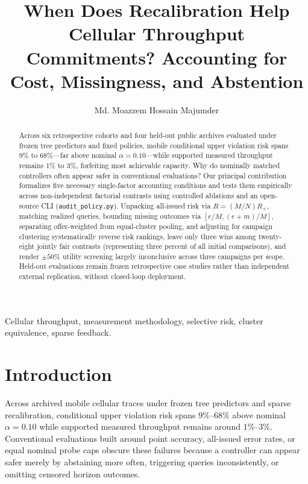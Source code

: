 \documentclass[journal,10pt]{IEEEtran}
\begin{document}
\title{When Does Recalibration Help Cellular Throughput Commitments? Accounting for Cost, Missingness, and Abstention}
\author{Md. Moazzem Hossain Majumder}
\maketitle
\begin{abstract}
Across six retrospective cohorts and four held-out public archives evaluated under frozen tree predictors and fixed policies, mobile conditional upper violation risk spans 9\% to 68\%---far above nominal $\alpha=0.10$---while supported measured throughput remains 1\% to 3\%, forfeiting most achievable capacity. Why do nominally matched controllers often appear safer in conventional evaluations? Our principal contribution formalizes five necessary single-factor accounting conditions and tests them empirically across non-independent factorial contrasts using controlled ablations and an open-source CLI (\texttt{audit\_policy.py}). Unpacking all-issued risk via $R=(M/N)R_+$, matching realized queries, bounding missing outcomes via $[e/M,(e+m)/M]$, separating offer-weighted from equal-cluster pooling, and adjusting for campaign clustering systematically reverse risk rankings, leave only three wins among twenty-eight jointly fair contrasts (representing three percent of all initial comparisons), and render $\pm 50\%$ utility screening largely inconclusive across three campaigns per scope. Held-out evaluations remain frozen retrospective case studies rather than independent external replication, without closed-loop deployment.
\end{abstract}
\begin{IEEEkeywords}Cellular throughput, measurement methodology, selective risk, cluster equivalence, sparse feedback.\end{IEEEkeywords}

\section{Introduction}
\label{sec:intro}
Across archived mobile cellular traces under frozen tree predictors and sparse recalibration, conditional upper violation risk spans $9\%$--$68\%$ above nominal $\alpha=0.10$ while supported measured throughput remains around $1\%$--$3\%$. Conventional evaluations built around point accuracy, all-issued error rates, or equal nominal probe caps obscure these failures because a controller can appear safer merely by abstaining more often, triggering queries inconsistently, or omitting censored horizon outcomes.
\end{document}

